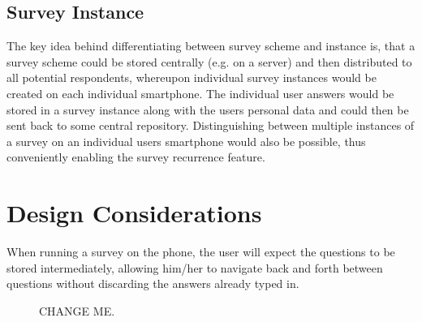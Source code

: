 \subsection{Survey Instance}
\label{subsec:surveyinstance}
The key idea behind differentiating between survey scheme and instance is, that a survey scheme could be stored centrally (e.g. on a server) and then distributed to all potential respondents, whereupon individual survey instances would be created on each individual smartphone. The individual user answers would be stored in a survey instance along with the users personal data and could then be sent back to some central repository. Distinguishing between multiple instances of a survey on an individual users smartphone would also be possible, thus conveniently enabling the survey recurrence feature.

\section{Design Considerations}
\label{sec:designconsiderations}
When running a survey on the phone, the user will expect the questions to be stored intermediately, allowing him/her to navigate back and forth between questions without discarding the answers already typed in.

\begin{figure}[!ht]
\centering
{} \hspace{10mm}
\caption{CHANGE ME.}
\label{fig:answertree}
\end{figure}